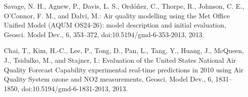 \documentclass{article} %
\begin{document}
\noindent [21] Savage, N. H., Agnew, P., Davis, L. S., Ord\'{o}\~{n}ez, C., Thorpe, R., Johnson, C. E., O'Connor, F. M., and Dalvi, M.: Air quality modelling using the Met Office Unified Model (AQUM OS24-26): model description and initial evaluation, Geosci. Model Dev., 6, 353--372, doi:10.5194/gmd-6-353-2013, 2013.

\noindent [22] Chai, T., Kim, H.-C., Lee, P., Tong, D., Pan, L., Tang, Y., Huang, J., McQueen, J., Tsidulko, M., and Stajner, I.: Evaluation of the United States National Air Quality Forecast Capability experimental real-time predictions in 2010 using Air Quality System ozone and NO2 measurements, Geosci. Model Dev., 6, 1831-- 1850, doi:10.5194/gmd-6-1831-2013, 2013.

\noindent 
\end{document}
